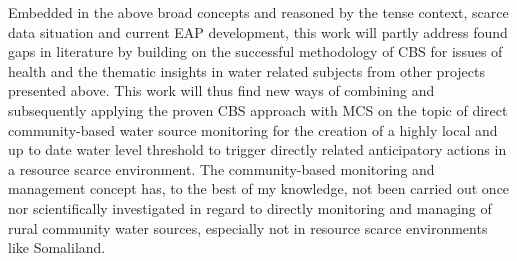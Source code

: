 Embedded in the above broad concepts and reasoned by the tense context, scarce data situation and current EAP development, this work will partly address found gaps in literature by building on the successful methodology of CBS for issues of health and the thematic insights in water related subjects from other projects presented above. This work will thus find new ways of combining and subsequently applying the proven CBS approach with MCS on the topic of direct community-based water source monitoring for the creation of a highly local and up to date water level threshold to trigger directly related anticipatory actions in a resource scarce environment.\newline
The community-based monitoring and management concept has, to the best of my knowledge, not been carried out once nor scientifically investigated in regard to directly monitoring and managing of rural community water sources, especially not in resource scarce environments like Somaliland.

